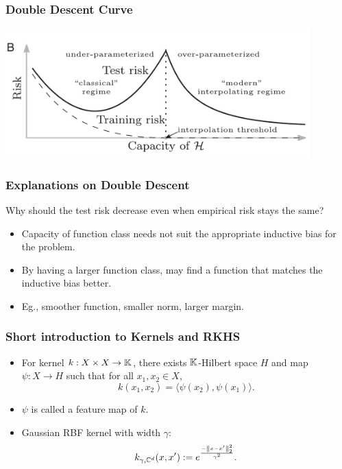 \documentclass{beamer}
\newcommand\norm[1]{\left\lVert#1\right\rVert}
\newcommand\inner[1]{\langle#1\rangle}
\begin{document}
\begin{frame}
\frametitle{Double Descent Curve}
\includegraphics[height=5cm]{Double-Descent-Curve.png}
\end{frame}

\begin{frame}
\frametitle{Explanations on Double Descent}
Why should the test risk decrease even when empirical risk stays the same?\\
\begin{itemize}[itemsep = 12pt]
	\item Capacity of function class needs not suit the appropriate inductive bias for the problem.
	\item By having a larger function class, may find a function that matches the inductive bias better.
	\item Eg., smoother function, smaller norm, larger margin.
\end{itemize}

\end{frame}

\begin{frame}
\frametitle{Short introduction to Kernels and RKHS}
\begin{itemize}[itemsep = 12pt]
	\item For kernel $k: X \times X \rightarrow \mathbb{K} $, there exists $\mathbb{K}$-Hilbert space $H$ and map $\psi:X \rightarrow H$ such that for all $x_1, x_2 \in X$,
	\[ k(x_1, x_2) = \inner{\psi(x_2), \psi(x_1)}. \] 
	\item $\psi$ is called a feature map of $k$.
	\item Gaussian RBF kernel with width $\gamma$:
	\[ k_{\gamma, \CC^d}(x, x') := e^{\frac{-\norm{x - x'}_2^2}{\gamma^2}}. \]
\end{itemize}
\end{frame}
\end{document}
